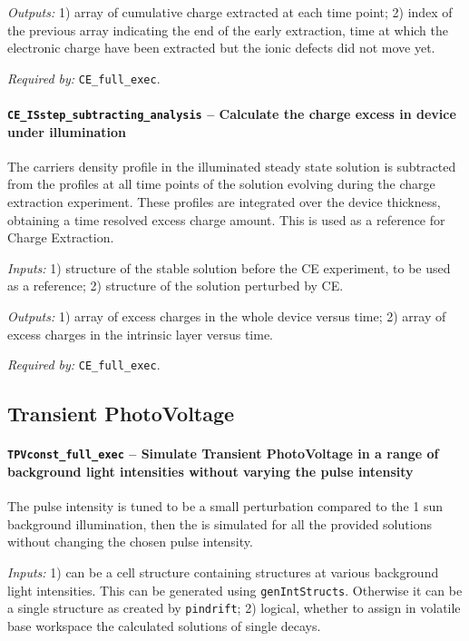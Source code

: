 		\textit{Outputs:} 1) array of cumulative charge extracted at each time point;
		2) index of the previous array indicating the end of the early extraction, time at which the electronic charge have been extracted but the ionic defects did not move yet.
		
		
		\textit{Required by:} \texttt{CE\_full\_exec}.
		
		\paragraph{\texttt{CE\_ISstep\_subtracting\_analysis} -- Calculate the charge excess in device under illumination}
			The carriers density profile in the illuminated steady state solution is subtracted from the profiles
			 at all time points of the solution evolving during the charge extraction experiment.
			 These profiles are integrated over the device thickness, obtaining a time resolved excess charge amount.
			This is used as a reference for Charge Extraction.
		
		\textit{Inputs:} 1) structure of the stable solution before the CE experiment, to be used as a reference;
		2) structure of the solution perturbed by CE.
		
		\textit{Outputs:} 1) array of excess charges in the whole device versus time;
		2) array of excess charges in the intrinsic layer versus time.
		
		\textit{Required by:} \texttt{CE\_full\_exec}.
		

	\subsection{Transient PhotoVoltage}\label{dd_tpv}

		\paragraph{\texttt{TPV\-const\_full\_exec} -- Simulate Transient PhotoVoltage in a range of background light intensities without varying the pulse intensity}	
The pulse intensity is tuned to be a small perturbation compared to the 1
 sun background illumination, then the  is simulated for all the
 provided solutions without changing the chosen pulse intensity.
 
		\textit{Inputs:} 1) can be a cell structure containing structures at various background
		     light intensities. This can be generated using \texttt{gen\-Int\-Structs}.
		     Otherwise it can be a single structure as created by \texttt{pin\-drift};
		   2) logical, whether to assign in volatile base
		     workspace the calculated solutions of single  decays.
				
